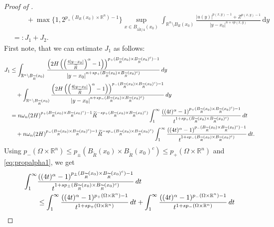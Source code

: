 \documentclass[11pt]{amsart}
\theoremstyle{plain}
\theoremstyle{definition}
\numberwithin{equation}{section}
\renewcommand{\d}{\textnormal{d}}
\newcommand{\R}{\mathbb{R}}
\begin{document}
\begin{proof} [Proof of ]
\begin{align*}
&\qquad +\max\{1,2^{p_+(B_R(x_0)\times\R^n)-1}\}\sup_{x \in B_{3\widetilde{R}/4}(x_0)} \int_{\mathbb{R}^n \setminus B_{R}(x_0)} \frac{|u(y)|^{p(x,y)-1}+Z^{p(x,y)-1}}{|y-x_0|^{n+sp(x,y)}} \,\mathrm{d}y\\
&  =:J_1+J_2.
\end{align*}
First note, that we can estimate $J_1$ as follows:
\begin{align*}
J_1&\leq \int_{\mathbb{R}^n \setminus B_{\widetilde{R}}(x_0)} \,\frac{\left(2H\left(\left( \frac{4|y-x_0|}{\widetilde{R}} \right)^{\alpha}-1\right)\right)^{p_+(B_{\widetilde{R}}(x_0) \times B_{\widetilde{R}}(x_0)^c)-1}}{|y-x_0|^{n+sp_+(B_{\widetilde{R}}(x_0) \times B_{\widetilde{R}}(x_0)^c)}} \, \d y\\
&\quad + \int_{\mathbb{R}^n \setminus B_{\widetilde{R}}(x_0)} \frac{\left(2H\left(\left( \frac{4|y-x_0|}{\widetilde{R}} \right)^{\alpha}-1\right)\right)^{p_-(B_{\widetilde{R}}(x_0) \times B_{\widetilde{R}}(x_0)^c)-1}}{|y-x_0|^{n+sp_-(B_{\widetilde{R}}(x_0) \times B_{\widetilde{R}}(x_0)^c)}}\, \d y\\
& = n\omega_n (2H)^{p_+(B_{\widetilde{R}}(x_0) \times B_{\widetilde{R}}(x_0)^c)-1} \widetilde{R}^{-sp_+(B_{\widetilde{R}}(x_0) \times B_{\widetilde{R}}(x_0)^c)}\int^{\infty}_1 \frac{((4t)^{\alpha} - 1)^{p_{+}(B_{\widetilde{R}}(x_0)\times B_{\widetilde{R}}(x_0)^c)-1}}{t^{1+sp_{+}(B_{\widetilde{R}}(x_0)\times B_{\widetilde{R}}(x_0)^c)}}\, \d t \\
& \quad + n\omega_n (2H)^{p_-(B_{\widetilde{R}}(x_0) \times B_{\widetilde{R}}(x_0)^c)-1} \widetilde{R}^{-sp_-(B_{\widetilde{R}}(x_0) \times B_{\widetilde{R}}(x_0)^c)}\int^{\infty}_1 \frac{((4t)^{\alpha} - 1)^{p_{-}(B_{\widetilde{R}}(x_0)\times B_{\widetilde{R}}(x_0)^c)-1}}{t^{1+sp_{-}(B_{\widetilde{R}}(x_0)\times B_{\widetilde{R}}(x_0)^c)}}\, \d t.
\end{align*}
Using $p_{-}(\Omega\times\R^n)\leq p_{\pm}(B_{\widetilde{R}}(x_0)\times B_{\widetilde{R}}(x_0)^c) \leq p_{+}(\Omega\times\R^n)$ and \eqref{eq:propalpha1}, we get 
\begin{align*}
\int^{\infty}_1& \frac{((4t)^{\alpha} - 1)^{p_{\pm}(B_{\widetilde{R}}(x_0)\times B_{\widetilde{R}}(x_0)^c)-1}}{t^{1+sp_{\pm}(B_{\widetilde{R}}(x_0)\times B_{\widetilde{R}}(x_0)^c)}}\, \d t \\
&\leq \int^{\infty}_1 \frac{((4t)^{\alpha} - 1)^{p_{+}(\Omega\times \R^n)-1}}{t^{1+sp_{+}(\Omega\times \R^n)}}\, \d t
+ \int^{\infty}_1 \frac{((4t)^{\alpha} - 1)^{p_{-}(\Omega\times \R^n)-1}}{t^{1+sp_{-}(\Omega\times \R^n)}}\, \d t \\

\end{align*}
\end{proof}
\end{document}
